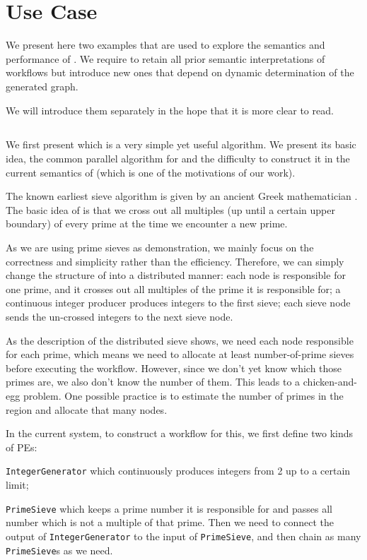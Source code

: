 \chapter{Use Case}
We present here two examples that are used to explore the semantics and performance of \dpy. We require to retain all prior semantic interpretations of workflows but introduce new ones that depend on dynamic determination of the generated graph.

We will introduce them separately in the hope that it is more clear to read.

\section{\tSieve} \label{sec:uc_sieve}
We first present \ttsieve which is a very simple yet useful algorithm. We present its basic idea, the common parallel algorithm for \ttsieve and the difficulty to construct it in the current semantics of \dpy (which is one of the motivations of our work).

The known earliest sieve algorithm is \ttesieve given by an ancient Greek mathematician \cite{o2009genuine}. The basic idea of \ttesieve is that we cross out all multiples (up until a certain upper boundary) of every prime at the time we encounter a new prime.

As we are using prime sieves as demonstration, we mainly focus on the correctness and simplicity rather than the efficiency. Therefore, we can simply change the structure of \ttesieve into a distributed manner: each node is responsible for one prime, and it crosses out all multiples of the prime it is responsible for; a continuous integer producer produces integers to the first sieve; each sieve node sends the un-crossed integers to the next sieve node.

As the description of the distributed sieve shows, we need each node responsible for each prime, which means we need to allocate at least number-of-prime sieves before executing the workflow. However, since we don't yet know which those primes are, we also don't know the number of them. This leads to a chicken-and-egg problem. One possible practice is to estimate the number of primes in the region and allocate that many nodes.

\newcommand{\cdIntGen}{\lstinline|IntegerGenerator|\xspace}
\newcommand{\cdSieve}{\lstinline|PrimeSieve|\xspace}

In the current \dpy system, to construct a workflow for this, we first define two kinds of PEs:
\begin{enumerate*}
	\item \cdIntGen which continuously produces integers from 2 up to a certain limit;
	\item \cdSieve which keeps a prime number it is responsible for and passes all number which is not a multiple of that prime. Then we need to connect the output of \cdIntGen to the input of \cdSieve , and then chain as many \cdSieve{}s as we need.
\end{enumerate*}

